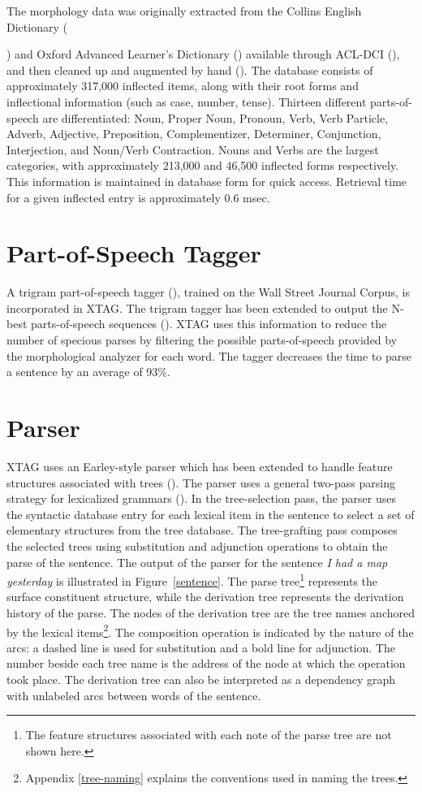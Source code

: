 The morphology data was originally extracted from the Collins English
Dictionary ({\cite{ced79}) and Oxford Advanced Learner's Dictionary
(\cite{oald74}) available through ACL-DCI (\cite{liberman89}), and then cleaned
up and augmented by hand (\cite{karp92}).  The database consists of
approximately 317,000 inflected items, along with their root forms and
inflectional information (such as case, number, tense).  Thirteen different
parts-of-speech are differentiated: Noun, Proper Noun, Pronoun, Verb, Verb
Particle, Adverb, Adjective, Preposition, Complementizer, Determiner,
Conjunction, Interjection, and Noun/Verb Contraction.  Nouns and Verbs are the
largest categories, with approximately 213,000 and 46,500 inflected forms
respectively.  This information is maintained in database form for quick
access.  Retrieval time for a given inflected entry is approximately 0.6 msec.

\section{Part-of-Speech Tagger}

A trigram part-of-speech tagger (\cite{kwc88}), trained on the Wall Street
Journal Corpus, is incorporated in XTAG. The trigram tagger has been extended
to output the N-best parts-of-speech sequences (\cite{soong90}).  XTAG uses
this information to reduce the number of specious parses by filtering the
possible parts-of-speech provided by the morphological analyzer for each word.
The tagger decreases the time to parse a sentence by an average of 93\%.

\section{Parser}

XTAG uses an Earley-style parser which has been extended to handle
feature structures associated with trees (\cite{schabes90}). The parser uses a
general two-pass parsing strategy for lexicalized grammars (\cite{schabes88}).
In the tree-selection pass, the parser uses the syntactic database entry for
each lexical item in the sentence to select a set of elementary structures from
the tree database.  The tree-grafting pass composes the selected trees using
substitution and adjunction operations to obtain the parse of the sentence.
The output of the parser for the sentence {\it I had a map yesterday} is
illustrated in Figure~\ref{sentence}. The parse tree\footnote{The feature
structures associated with each note of the parse tree are not shown here.}
represents the surface constituent structure, while the derivation tree
represents the derivation history of the parse. The nodes of the derivation
tree are the tree names anchored by the lexical items\footnote{Appendix
\ref{tree-naming} explains the conventions used in naming the trees.}.  The
composition operation is indicated by the nature of the arcs: a dashed line is
used for substitution and a bold line for adjunction.  The number beside each
tree name is the address of the node at which the operation took place.  The
derivation tree can also be interpreted as a dependency graph with unlabeled
arcs between words of the sentence.

}
